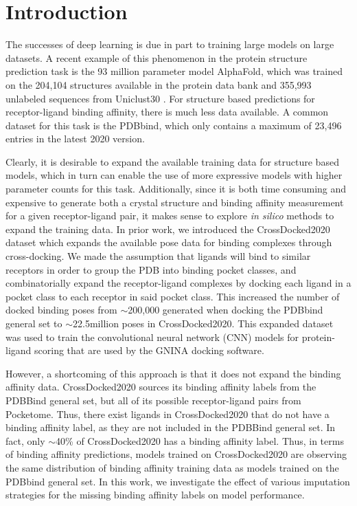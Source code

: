 \documentclass[journal=jmcmar,manuscript=article]{achemso}
\begin{document}

\section{Introduction}

The successes of deep learning is due in part to training large models on large datasets.
A recent example of this phenomenon in the protein structure prediction task is the 93 million parameter model AlphaFold, which was trained on the 204,104 structures available in the protein data bank and 355,993 unlabeled sequences from Uniclust30 \cite{alphafold}.
For structure based predictions for receptor-ligand binding affinity, there is much less data available.
A common dataset for this task is the PDBbind,\cite{pdbbind2016} which only contains a maximum of 23,496 entries in the latest 2020 version.

Clearly, it is desirable to expand the available training data for structure based models, which in turn can enable the use of more expressive models with higher parameter counts for this task.
Additionally, since it is both time consuming and expensive to generate both a crystal structure and binding affinity measurement for a given receptor-ligand pair, it makes sense to explore \textit{in silico} methods to expand the training data.
In prior work, we introduced the CrossDocked2020 dataset which expands the available pose data for binding complexes through cross-docking\cite{crossdocked2020}.
We made the assumption that ligands will bind to similar receptors in order to group the PDB into binding pocket classes, and combinatorially expand the receptor-ligand complexes by docking each ligand in a pocket class to each receptor in said pocket class.
This increased the number of docked binding poses from $\sim$200,000 generated when docking the PDBbind general set to $\sim$22.5million poses in CrossDocked2020\cite{crossdocked2020}. This expanded dataset was used to train the convolutional neural network (CNN) models for protein-ligand scoring\cite{ragoza2017protein} that are used by the GNINA docking software.\cite{mcnutt2021gnina}

However, a shortcoming of this approach is that it does not expand the binding affinity data.
CrossDocked2020 sources its binding affinity labels from the PDBBind general set, but all of its possible receptor-ligand pairs from Pocketome.\cite{pocketome}
Thus, there exist ligands in CrossDocked2020 that do not have a binding affinity label, as they are not included in the PDBBind general set.
In fact, only $\sim$40\% of CrossDocked2020 has a binding affinity label.
Thus, in terms of binding affinity predictions, models trained on CrossDocked2020 are observing the same distribution of binding affinity training data as models trained on the PDBbind general set.
In this work, we investigate the effect of various imputation strategies for the missing binding affinity labels on model performance.
\end{document}
